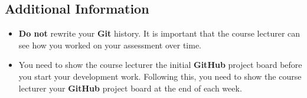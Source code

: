 \documentclass{article}
\begin{document}
\subsection*{Additional Information}
\begin{itemize}
    \item \textbf{Do not} rewrite your \textbf{Git} history. It is important that the course lecturer can see how you worked on your assessment over time. 
    \item You need to show the course lecturer the initial \textbf{GitHub} project board before you start your development work. Following this, you need to show the course lecturer your \textbf{GitHub} project board at the end of each week.
\end{itemize} 
\end{document}
